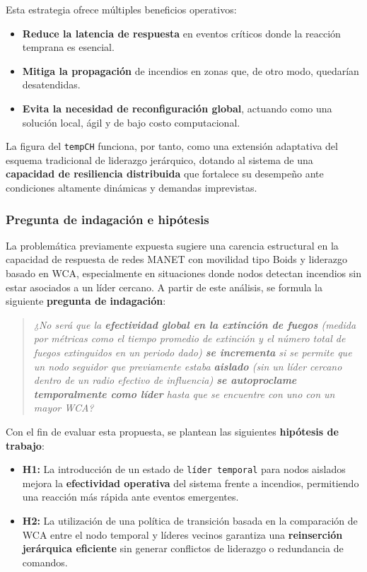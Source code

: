 \documentclass{article}
\begin{document}
Esta estrategia ofrece múltiples beneficios operativos:
\begin{itemize}
    \item \textbf{Reduce la latencia de respuesta} en eventos críticos donde la reacción temprana es esencial.
    \item \textbf{Mitiga la propagación} de incendios en zonas que, de otro modo, quedarían desatendidas.
    \item \textbf{Evita la necesidad de reconfiguración global}, actuando como una solución local, ágil y de bajo costo computacional.
\end{itemize}

La figura del \texttt{tempCH} funciona, por tanto, como una extensión adaptativa del esquema tradicional de liderazgo jerárquico, dotando al sistema de una \textbf{capacidad de resiliencia distribuida} que fortalece su desempeño ante condiciones altamente dinámicas y demandas imprevistas.


\subsubsection{Pregunta de indagación e hipótesis}

La problemática previamente expuesta sugiere una carencia estructural en la capacidad de respuesta de redes MANET con movilidad tipo Boids y liderazgo basado en WCA, especialmente en situaciones donde nodos detectan incendios sin estar asociados a un líder cercano. A partir de este análisis, se formula la siguiente \textbf{pregunta de indagación}:

\begin{quote}
\textit{¿No será que la \textbf{efectividad global en la extinción de fuegos} (medida por métricas como el tiempo promedio de extinción y el número total de fuegos extinguidos en un periodo dado) \textbf{se incrementa} si se permite que un nodo seguidor que previamente estaba \textbf{aislado} (sin un líder cercano dentro de un radio efectivo de influencia) \textbf{se autoproclame temporalmente como líder} hasta que se encuentre con uno con un mayor WCA?}
\end{quote}

Con el fin de evaluar esta propuesta, se plantean las siguientes \textbf{hipótesis de trabajo}:

\begin{itemize}
    \item \textbf{H1:} La introducción de un estado de \texttt{líder temporal} para nodos aislados mejora la \textbf{efectividad operativa} del sistema frente a incendios, permitiendo una reacción más rápida ante eventos emergentes.

    \item \textbf{H2:} La utilización de una política de transición basada en la comparación de WCA entre el nodo temporal y líderes vecinos garantiza una \textbf{reinserción jerárquica eficiente} sin generar conflictos de liderazgo o redundancia de comandos.
\end{itemize}
\end{document}
